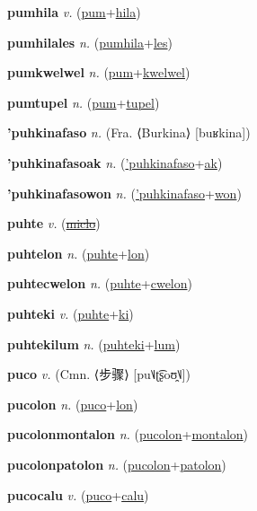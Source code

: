 \textbf{\hypertarget{pumhila}{pumhila}} \textit{v.} (\hyperlink{pum}{pum}+\allowbreak \hyperlink{hila}{hila})


\textbf{\hypertarget{pumhilales}{pumhilales}} \textit{n.} (\hyperlink{pumhila}{pumhila}+\allowbreak \hyperlink{les}{les})


\textbf{\hypertarget{pumkwelwel}{pumkwelwel}} \textit{n.} (\hyperlink{pum}{pum}+\allowbreak \hyperlink{kwelwel}{kwelwel})


\textbf{\hypertarget{pumtupel}{pumtupel}} \textit{n.} (\hyperlink{pum}{pum}+\allowbreak \hyperlink{tupel}{tupel})


\textbf{\hypertarget{'puhkinafaso}{'puhkinafaso}} \textit{n.} (Fra. ⟨Burkina⟩ [buʁkina])


\textbf{\hypertarget{'puhkinafasoak}{'puhkinafasoak}} \textit{n.} (\hyperlink{'puhkinafaso}{'puhkinafaso}+\allowbreak \hyperlink{ak}{ak})


\textbf{\hypertarget{'puhkinafasowon}{'puhkinafasowon}} \textit{n.} (\hyperlink{'puhkinafaso}{'puhkinafaso}+\allowbreak \hyperlink{won}{won})


\textbf{\hypertarget{puhte}{puhte}} \textit{v.} (\hyperlink{miclo}{\sout{miclo}})


\textbf{\hypertarget{puhtelon}{puhtelon}} \textit{n.} (\hyperlink{puhte}{puhte}+\allowbreak \hyperlink{lon}{lon})


\textbf{\hypertarget{puhtecwelon}{puhtecwelon}} \textit{n.} (\hyperlink{puhte}{puhte}+\allowbreak \hyperlink{cwelon}{cwelon})


\textbf{\hypertarget{puhteki}{puhteki}} \textit{v.} (\hyperlink{puhte}{puhte}+\allowbreak \hyperlink{ki}{ki})


\textbf{\hypertarget{puhtekilum}{puhtekilum}} \textit{n.} (\hyperlink{puhteki}{puhteki}+\allowbreak \hyperlink{lum}{lum})


\textbf{\hypertarget{puco}{puco}} \textit{v.} (Cmn. ⟨{\chinese{}步骤}⟩ [pu˥˩ʈ͡ʂoʊ̯˥˩])


\textbf{\hypertarget{pucolon}{pucolon}} \textit{n.} (\hyperlink{puco}{puco}+\allowbreak \hyperlink{lon}{lon})


\textbf{\hypertarget{pucolonmontalon}{pucolonmontalon}} \textit{n.} (\hyperlink{pucolon}{pucolon}+\allowbreak \hyperlink{montalon}{montalon})


\textbf{\hypertarget{pucolonpatolon}{pucolonpatolon}} \textit{n.} (\hyperlink{pucolon}{pucolon}+\allowbreak \hyperlink{patolon}{patolon})


\textbf{\hypertarget{pucocalu}{pucocalu}} \textit{v.} (\hyperlink{puco}{puco}+\allowbreak \hyperlink{calu}{calu})



